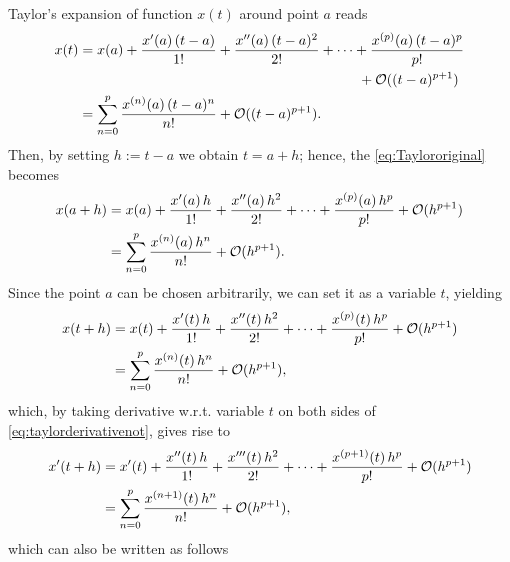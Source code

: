 \documentclass[12pt]{article}
\begin{document}
\begin{observationboxed}
	\label{eq:Taylorniceform}
	Taylor's expansion of function $x(t)$ around point $a$ reads 
	\begin{align}
		\label{eq:Taylororiginal}
		x(t) 
		 & = x(a) 
		+ \frac{x'(a)\,(t-a)}{1!} + \frac{x''(a)\,(t-a)^2}{2!} + \dots + \frac{x^{(p)}(a)\,(t-a)^p}{p!}\notag           \\
		 & \quad\quad\quad\quad\quad\quad\quad\quad\quad\quad\quad\quad\quad\quad\quad\quad\quad\quad\quad\quad 
		+ \mathcal{O}((t-a)^{p+1})                                                                               \notag \\
		 & = \sum_{n=0}^{p} \frac{x^{(n)}(a)\,(t-a)^{n}}{n!} + \mathcal{O}((t-a)^{p+1}).
	\end{align}
	Then, by setting $h:= t-a$ we obtain $t=a+h$; hence, the \eqref{eq:Taylororiginal} becomes
	\begin{align}
		\label{eq:taylorderivativeno}
		x(a+h) 
		 & = x(a) 
		+ \frac{x'(a)\,h}{1!} + \frac{x''(a)\,h^2}{2!} + \dots + \frac{x^{(p)}(a)\,h^p}{p!}
		+ \mathcal{O}(h^{p+1})                                                 \notag \\
		 & = \sum_{n=0}^{p} \frac{x^{(n)}(a)\,h^{n}}{n!} + \mathcal{O}(h^{p+1}).
	\end{align}
	Since the point $a$ can be chosen arbitrarily, we can set it as a variable $t$, yielding
	\begin{align}
		\label{eq:taylorderivativenot}
		x(t+h) 
		 & = x(t) 
		+ \frac{x'(t)\,h}{1!} + \frac{x''(t)\,h^2}{2!} + \dots + \frac{x^{(p)}(t)\,h^p}{p!}
		+ \mathcal{O}(h^{p+1})                                                 \notag \\
		 & = \sum_{n=0}^{p} \frac{x^{(n)}(t)\,h^{n}}{n!} + \mathcal{O}(h^{p+1}),
	\end{align}
	which, by taking derivative w.r.t. variable $t$ on both sides of \eqref{eq:taylorderivativenot}, gives rise to
	\begin{align}
		\label{eq:taylorderivative}
		x'(t+h) 
		 & = x'(t) 
		+ \frac{x''(t)\,h}{1!} + \frac{x'''(t)\,h^2}{2!} + \dots + \frac{x^{(p+1)}(t)\,h^p}{p!}
		+ \mathcal{O}(h^{p+1})
		\notag                                                                     \\
		 & = \sum_{n=0}^{p} \frac{x^{(n+1)}(t)\,h^{n}}{n!} + \mathcal{O}(h^{p+1}),
	\end{align}
	which can also be written as follows 
	\begin{align}
		\label{eq:taylorderivative2}

\end{align}
\end{observationboxed}
\end{document}
